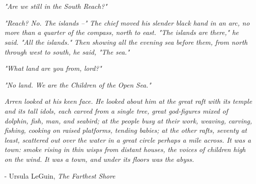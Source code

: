 \section{}

\textit{"Are we still in the South Reach?"}

\textit{"Reach? No. The islands --" The chief moved his slender black hand in
an arc, no more than a quarter of the compass, north to east. "The islands are
there," he said. "All the islands." Then showing all the evening sea before
them, from north through west to south, he said, "The sea."}

\textit{"What land are you from, lord?"}

\textit{"No land. We are the Children of the Open Sea."}

\textit{Arren looked at his keen face. He looked about him at the great raft
with its temple and its tall idols, each carved from a single tree, great
god-figures mixed of dolphin, fish, man, and seabird; at the people busy at
their work, weaving, carving, fishing, cooking on raised platforms, tending
babies; at the other rafts, seventy at least, scattered out over the water in a
great circle perhaps a mile across. It was a town: smoke rising in thin wisps
from distant houses, the voices of children high on the wind. It was a town,
and under its floors was the abyss.}

- Ursula LeGuin, \emph{The Farthest Shore}
